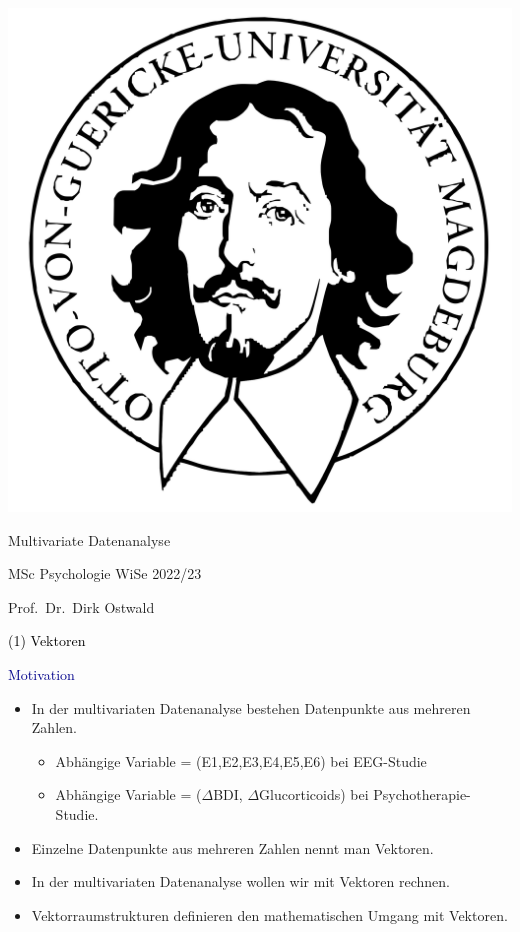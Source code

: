 \documentclass[
  8pt,
  ignorenonframetext,
]{beamer}
\author{}
\date{\vspace{-2.5em}}
\providecommand{\tightlist}{%
  \setlength{\itemsep}{0pt}\setlength{\parskip}{0pt}}
\begin{document}
\begin{frame}[plain]{}
\protect\hypertarget{section}{}
\center

\begin{center}\includegraphics[width=0.2\linewidth]{2_Abbildungen/mvda_2_otto} \end{center}

\vspace{2mm}

\Huge

Multivariate Datenanalyse \vspace{6mm}

\Large

MSc Psychologie WiSe 2022/23

\vspace{6mm}
\large

Prof.~Dr.~Dirk Ostwald
\end{frame}

\begin{frame}[plain]{}
\protect\hypertarget{section-1}{}
\vfill
\center
\huge

\textcolor{black}{(1) Vektoren} \vfill
\end{frame}

\begin{frame}{}
\protect\hypertarget{section-2}{}
\textcolor{darkblue}{Motivation} 

\begin{itemize}
\tightlist
\item
  In der multivariaten Datenanalyse bestehen Datenpunkte aus mehreren
  Zahlen.

  \begin{itemize}
  \tightlist
  \item
    Abhängige Variable = (E1,E2,E3,E4,E5,E6) bei EEG-Studie
  \item
    Abhängige Variable = (\(\Delta\)BDI, \(\Delta\)Glucorticoids) bei
    Psychotherapie-Studie.
  \end{itemize}
\item
  Einzelne Datenpunkte aus mehreren Zahlen nennt man Vektoren.
\item
  In der multivariaten Datenanalyse wollen wir mit Vektoren rechnen.
\item
  Vektorraumstrukturen definieren den mathematischen Umgang mit
  Vektoren.
\end{itemize}
\end{frame}
\end{document}
